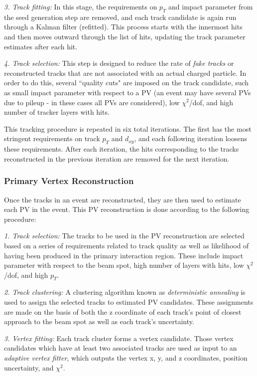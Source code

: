 \noindent\emph{3. Track fitting:} In this stage, the requirements on $p_T$ and impact parameter from the seed generation step are removed, and each track candidate is again run through a Kalman filter (refitted). This process starts with the innermost hits and then moves outward through the list of hits, updating the track parameter estimates after each hit.


\noindent\emph{4. Track selection:} This step is designed to reduce the rate of \textit{fake tracks} or reconstructed tracks that are not associated with an actual charged particle. In order to do this, several ``quality cuts" are imposed on the track candidate, such as small impact parameter with respect to a PV (an event may have several PVs due to pileup - in these cases all PVs are considered), low $\chi^2$/dof, and high number of tracker layers with hits.


This tracking procedure is repeated in six total iterations. The first has the most stringent requirements on track $p_T$ and $d_{xy}$, and each following iteration loosens these requirements. After each iteration, the hits corresponding to the tracks reconstructed in the previous iteration are removed for the next iteration.

\subsubsection{Primary Vertex Reconstruction}\label{sec:Vertexing}

Once the tracks in an event are reconstructed, they are then used to estimate each PV in the event. This PV reconstruction is done according to the following procedure\cite{TrackReco}:


\noindent\emph{1. Track selection:} The tracks to be used in the PV reconstruction are selected based on a series of requirements related to track quality as well as likelihood of having been produced in the primary interaction region. These include impact parameter with respect to the beam spot, high number of layers with hits, low $\chi^2$/dof, and high $p_T$.


\noindent\emph{2. Track clustering:} A clustering algorithm known as \textit{deterministic annealing} is used to assign the selected tracks to estimated PV candidates. These assignments are made on the basis of both the z coordinate of each track's point of closest approach to the beam spot as well as each track's uncertainty.


\noindent\emph{3. Vertex fitting:} Each track cluster forms a vertex candidate. Those vertex candidates which have at least two associated tracks are used as input to an \textit{adaptive vertex fitter}\cite{AdaptiveVertexFitter}, which outputs the vertex x, y, and z coordinates, position uncertainty, and $\chi^2$.


